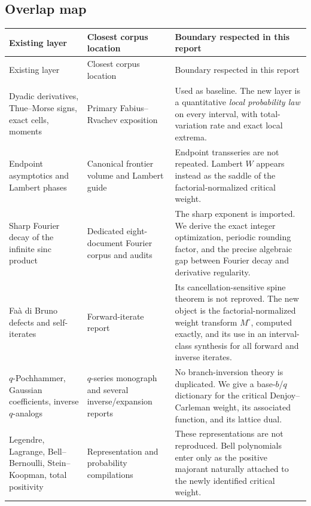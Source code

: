 \documentclass[11pt,a4paper]{article}
\theoremstyle{definition}
\theoremstyle{remark}
\begin{document}
\subsection{Overlap map}

\begin{longtable}{>{\raggedright\arraybackslash}p{}
                  >{\raggedright\arraybackslash}p{}
                  >{\raggedright\arraybackslash}p{}}
\toprule
Existing layer & Closest corpus location & Boundary respected in this report \\
\midrule
\endfirsthead
\toprule
Existing layer & Closest corpus location & Boundary respected in this report \\
\midrule
\endhead
Dyadic derivatives, Thue--Morse signs, exact cells, moments
& Primary Fabius--Rvachev exposition \cite{ProveItMain}
& Used as baseline.  The new layer is a quantitative \emph{local probability law}
on every interval, with total-variation rate and exact local extrema. \\
\addlinespace
Endpoint asymptotics and Lambert phases
& Canonical frontier volume and Lambert guide \cite{ProveItFrontier,ProveItManifest}
& Endpoint transseries are not repeated.  Lambert $W$ appears instead as the saddle
of the factorial-normalized critical weight. \\
\addlinespace
Sharp Fourier decay of the infinite sinc product
& Dedicated eight-document Fourier corpus and audits \cite{ProveItManifest}
& The sharp exponent is imported.  We derive the exact integer optimization,
periodic rounding factor, and the precise algebraic gap between Fourier decay and
derivative regularity. \\
\addlinespace
Fa\`a di Bruno defects and self-iterates
& Forward-iterate report \cite{ProveItIterates}
& Its cancellation-sensitive spine theorem is not reproved.  The new object is the
factorial-normalized weight transform $M^\circ$, computed exactly, and its use in an
interval-class synthesis for all forward and inverse iterates. \\
\addlinespace
$q$-Pochhammer, Gaussian coefficients, inverse $q$-analogs
& $q$-series monograph and several inverse/expansion reports \cite{ProveItManifest}
& No branch-inversion theory is duplicated.  We give a base-$b$/$q$ dictionary for
the critical Denjoy--Carleman weight, its associated function, and its lattice dual. \\
\addlinespace
Legendre, Lagrange, Bell--Bernoulli, Stein--Koopman, total positivity
& Representation and probability compilations \cite{ProveItManifest}
& These representations are not reproduced.  Bell polynomials enter only as the
positive majorant naturally attached to the newly identified critical weight. \\
\bottomrule
\end{longtable}
\end{document}
